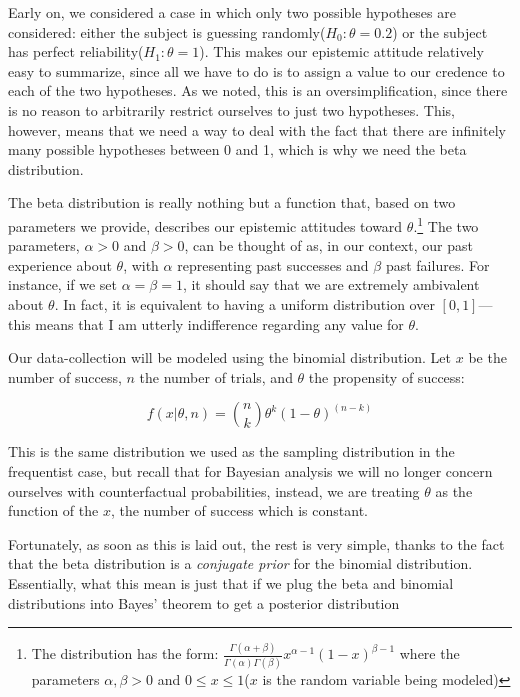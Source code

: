Early on, we considered a case in which only two possible hypotheses are
considered: either the subject is guessing
randomly(\(H_0:\theta = 0.2\)) or the subject has perfect
reliability(\(H_1:\theta = 1\)). This makes our epistemic attitude
relatively easy to summarize, since all we have to do is to assign a
value to our credence to each of the two hypotheses. As we noted, this
is an oversimplification, since there is no reason to arbitrarily
restrict ourselves to just two hypotheses. This, however, means that we
need a way to deal with the fact that there are infinitely many possible
hypotheses between 0 and 1, which is why we need the beta distribution.

The beta distribution is really nothing but a function that, based on
two parameters we provide, describes our epistemic attitudes toward
\(\theta\).\footnote{The distribution has the form:
  \(\frac{\Gamma(\alpha + \beta)}{\Gamma(\alpha)\Gamma(\beta)}x^{\alpha -1} (1-x)^{\beta -1}\)
  where the parameters \(\alpha,\beta > 0\) and
  \(0\leq x \leq 1\)(\(x\) is the random variable being
  modeled) } The two parameters, \(\alpha>0\) and \(\beta>0\), can be
thought of as, in our context, our past experience about \(\theta\),
with \(\alpha\) representing past successes and \(\beta\) past failures.
For instance, if we set \(\alpha = \beta = 1\), it should say that we
are extremely ambivalent about \(\theta\). In fact, it is equivalent to
having a uniform distribution over \([0,1]\)---this means that I am
utterly indifference regarding any value for \(\theta\).

Our data-collection will be modeled using the binomial distribution. Let
\(x\) be the number of success, \(n\) the number of trials, and
\(\theta\) the propensity of success:

\[f(x|\theta, n) = {n\choose k} \theta^k (1-\theta)^{(n-k)}\]

This is the same distribution we used as the sampling distribution in
the frequentist case, but recall that for Bayesian analysis we will no
longer concern ourselves with counterfactual probabilities, instead, we
are treating \(\theta\) as the function of the \(x\), the number of
success which is constant.

Fortunately, as soon as this is laid out, the rest is very simple,
thanks to the fact that the beta distribution is a \emph{conjugate
prior} for the binomial distribution. Essentially, what this mean is
just that if we plug the beta and binomial distributions into Bayes'
theorem to get a posterior distribution

